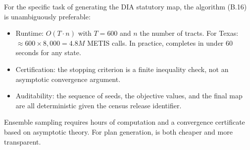 For the specific task of generating the DIA statutory map,
the \cs{} algorithm (B.16) is unambiguously preferable:
\begin{itemize}
\item Runtime: $O(T \cdot n)$ with $T = 600$ and $n$ the number of tracts.
      For Texas: $\approx 600 \times 8{,}000 = 4.8M$ METIS calls.
      In practice, \cs{} completes in under 60 seconds for any state.
\item Certification: the stopping criterion is a finite inequality check,
      not an asymptotic convergence argument.
\item Auditability: the sequence of seeds, the objective values, and the
      final map are all deterministic given the census release identifier.
\end{itemize}

Ensemble sampling requires hours of computation and a convergence
certificate based on asymptotic theory.
For plan generation, \cs{} is both cheaper and more transparent.
